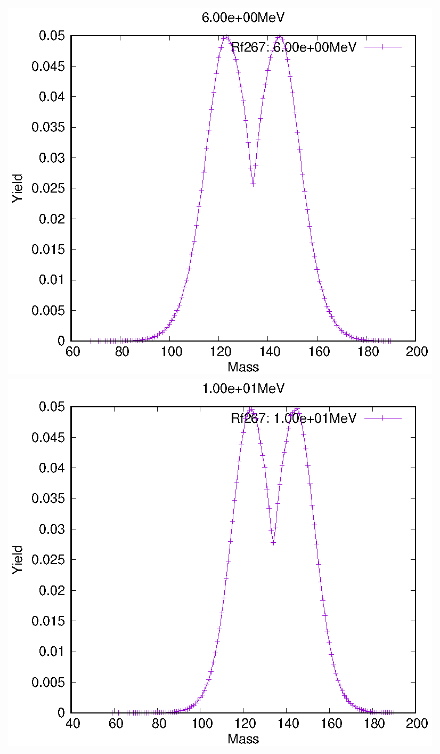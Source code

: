 \begin{figure}[htbp]
 \begin{minipage}{0.33\textwidth} \begin{center} \includegraphics[width=\textwidth]{YA/Rf267_6.00e+00.eps} \end{center} \end{minipage}
\begin{minipage}{0.33\textwidth} \begin{center} \includegraphics[width=\textwidth]{YA/Rf267_1.00e+01.eps} \end{center} \end{minipage}

\end{figure}
